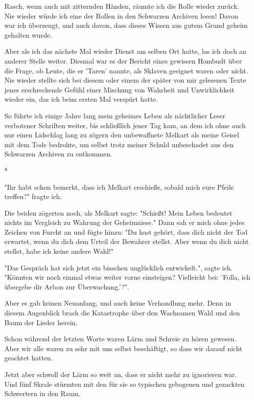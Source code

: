 \documentclass[10pt, a4paper, oneside]{book}
\begin{document}
\begin{multicols}{2}
Rasch, wenn auch mit zitternden Händen, räumte ich die Rolle wieder zurück. Nie wieder würde ich eine der Rollen in den Schwarzen Archiven lesen! Davon war ich überzeugt, und auch davon, dass dieses Wissen aus gutem Grund geheim gehalten wurde.

Aber als ich das nächste Mal wieder Dienst am selben Ort hatte, las ich doch an anderer Stelle weiter. Diesmal war es der Bericht eines gewissen Hombudt über die Frage, ob Leute, die er 'Taren' nannte, als Sklaven geeignet waren oder nicht. Nie wieder stellte sich bei diesem oder einem der später von mir gelesenen Texte jenes erschreckende Gefühl einer Mischung von Wahrheit und Unwirklichkeit wieder ein, das ich beim ersten Mal verspürt hatte.

So führte ich einige Jahre lang mein geheimes Leben als nächtlicher Leser verbotener Schriften weiter, bis schließlich jener Tag kam, an dem ich ohne auch nur einen Lidschlag lang zu zögern den unbewaffnete Melkart als meine Geisel mit dem Tode bedrohte, um selbst trotz meiner Schuld unbeschadet aus den Schwarzen Archiven zu entkommen.

\begin{center}
    *
\end{center}

"Ihr habt schon bemerkt, dass ich Melkart erschieße, sobald mich eure Pfeile treffen?" fragte ich.

Die beiden zögerten noch, als Melkart sagte: "Schießt! Mein Leben bedeutet nichts im Vergleich zu Wahrung der Geheimnisse." Dann sah er mich ohne jedes Zeichen von Furcht an und fügte hinzu: "Du hast gehört, dass dich nicht der Tod erwartet, wenn du dich dem Urteil der Bewahrer stellst. Aber wenn du dich nicht stellst, habe ich keine andere Wahl!"

"Das Gespräch hat sich jetzt ein bisschen unglücklich entwickelt.", sagte ich. "Könnten wir noch einmal etwas weiter vorne einsteigen? Vielleicht bei: 'Folla, ich übergebe dir Arbon zur Überwachung.'?".

Aber es gab keinen Neuanfang, und auch keine Verhandlung mehr. Denn in diesem Augenblick brach die Katastrophe über den Wachsamen Wald und den Baum der Lieder herein.

Schon während der letzten Worte waren Lärm und Schreie zu hören gewesen. Aber wir alle waren zu sehr mit uns selbst beschäftigt, so dass wir darauf nicht geachtet hatten.

Jetzt aber schwoll der Lärm so weit an, dass er nicht mehr zu ignorieren war. Und fünf Skrale stürmten mit den für sie so typischen gebogenen und gezackten Schwertern in den Raum.


\end{multicols}
\end{document}
